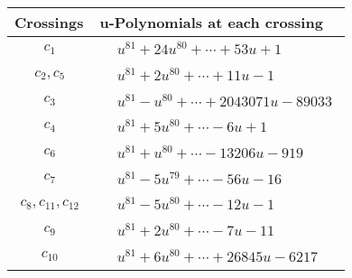 \documentclass[1p]{elsarticle_modified}
\theoremstyle{definition}
\begin{document}
\begin{tabular}{m{50pt}|m{274pt}}
Crossings & \hspace{64pt}u-Polynomials at each crossing \\
\hline $$\begin{aligned}c_{1}\end{aligned}$$&$\begin{aligned}
&u^{81}+24 u^{80}+\cdots+53 u+1
\end{aligned}$\\
\hline $$\begin{aligned}c_{2},c_{5}\end{aligned}$$&$\begin{aligned}
&u^{81}+2 u^{80}+\cdots+11 u-1
\end{aligned}$\\
\hline $$\begin{aligned}c_{3}\end{aligned}$$&$\begin{aligned}
&u^{81}- u^{80}+\cdots+2043071 u-89033
\end{aligned}$\\
\hline $$\begin{aligned}c_{4}\end{aligned}$$&$\begin{aligned}
&u^{81}+5 u^{80}+\cdots-6 u+1
\end{aligned}$\\
\hline $$\begin{aligned}c_{6}\end{aligned}$$&$\begin{aligned}
&u^{81}+u^{80}+\cdots-13206 u-919
\end{aligned}$\\
\hline $$\begin{aligned}c_{7}\end{aligned}$$&$\begin{aligned}
&u^{81}-5 u^{79}+\cdots-56 u-16
\end{aligned}$\\
\hline $$\begin{aligned}c_{8},c_{11},c_{12}\end{aligned}$$&$\begin{aligned}
&u^{81}-5 u^{80}+\cdots-12 u-1
\end{aligned}$\\
\hline $$\begin{aligned}c_{9}\end{aligned}$$&$\begin{aligned}
&u^{81}+2 u^{80}+\cdots-7 u-11
\end{aligned}$\\
\hline $$\begin{aligned}c_{10}\end{aligned}$$&$\begin{aligned}
&u^{81}+6 u^{80}+\cdots+26845 u-6217
\end{aligned}$\\
\hline
\end{tabular}\\~\\
\end{document}
